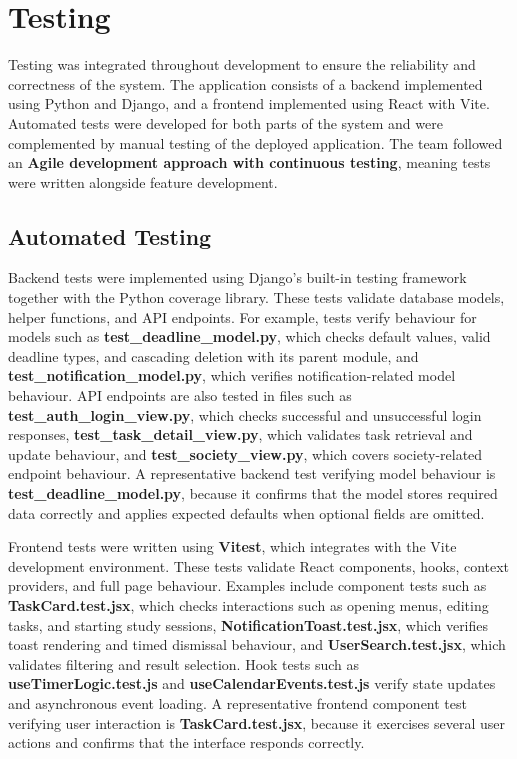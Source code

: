 \chapter{Testing}
\label{chap:testing}

Testing was integrated throughout development to ensure the reliability and correctness of the system. The application consists of a backend implemented using Python and Django, and a frontend implemented using React with Vite. Automated tests were developed for both parts of the system and were complemented by manual testing of the deployed application. The team followed an \textbf{Agile development approach with continuous testing}, meaning tests were written alongside feature development.

\section{Automated Testing}

Backend tests were implemented using Django’s built-in testing framework together with the Python coverage library. These tests validate database models, helper functions, and API endpoints. For example, tests verify behaviour for models such as \textbf{test\_deadline\_model.py}, which checks default values, valid deadline types, and cascading deletion with its parent module, and \textbf{test\_notification\_model.py}, which verifies notification-related model behaviour. API endpoints are also tested in files such as \textbf{test\_auth\_login\_view.py}, which checks successful and unsuccessful login responses, \textbf{test\_task\_detail\_view.py}, which validates task retrieval and update behaviour, and \textbf{test\_society\_view.py}, which covers society-related endpoint behaviour. A representative backend test verifying model behaviour is \textbf{test\_deadline\_model.py}, because it confirms that the model stores required data correctly and applies expected defaults when optional fields are omitted.

Frontend tests were written using \textbf{Vitest}, which integrates with the Vite development environment. These tests validate React components, hooks, context providers, and full page behaviour. Examples include component tests such as \textbf{TaskCard.test.jsx}, which checks interactions such as opening menus, editing tasks, and starting study sessions, \textbf{NotificationToast.test.jsx}, which verifies toast rendering and timed dismissal behaviour, and \textbf{UserSearch.test.jsx}, which validates filtering and result selection. Hook tests such as \textbf{useTimerLogic.test.js} and \textbf{useCalendarEvents.test.js} verify state updates and asynchronous event loading. A representative frontend component test verifying user interaction is \textbf{TaskCard.test.jsx}, because it exercises several user actions and confirms that the interface responds correctly.

